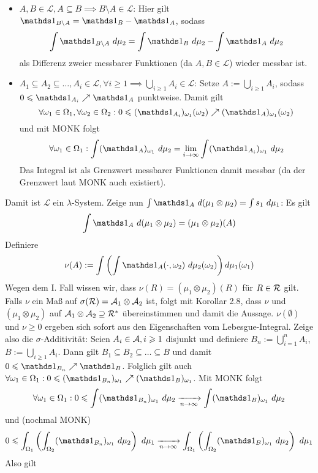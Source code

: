 \begin{enumerate}[label=\Roman*.]
\begin{itemize}
        \item $A,B\in\mathcal{L},A\subseteq B\implies B\setminus A\in\mathcal{L}$: Hier gilt $\ind{B\setminus A}=\ind{B}-\ind{A}$, sodass
        $$\int\ind{B\setminus A}\ d\mu_2=\int\ind{B}\ d\mu_2-\int\ind{A}\ d\mu_2$$
        als Differenz zweier messbarer Funktionen (da $A,B\in\mathcal{L}$) wieder messbar ist.
        \item $A_1\subseteq A_2\subseteq\hdots,A_i\in\mathcal{L},\forall i\geq1\implies\bigcup_{i\geq1}A_i\in\mathcal{L}$: Setze $A:=\bigcup_{i\geq1}A_i$, sodass $0\leq\ind{A_i}\nearrow\ind{A}$ punktweise. Damit gilt
        $$\forall\omega_1\in\Omega_1,\forall\omega_2\in\Omega_2:0\leq(\ind{A_i})_{\omega_1}(\omega_2)\nearrow(\ind{A})_{\omega_1}(\omega_2)$$
        und mit MONK folgt
        $$\forall\omega_1\in\Omega_1:\int(\ind{A})_{\omega_1}\ d\mu_2=\lim_{i\to\infty}\int(\ind{A_i})_{\omega_1}\ d\mu_2$$
        Das Integral ist als Grenzwert messbarer Funktionen damit messbar (da der Grenzwert laut MONK auch existiert).
    \end{itemize} 
    Damit ist $\mathcal{L}$ ein $\lambda$-System. Zeige nun $\int \ind{A}\ d(\mu_1\otimes\mu_2)=\int s_1\ d\mu_1$: Es gilt 
    $$\int\ind{A}\ d(\mu_1\otimes\mu_2)=(\mu_1\otimes\mu_2)(A)$$
    Definiere
    $$\nu(A):=\int\left(\int\ind{A}(\cdot,\omega_2)\ d\mu_2(\omega_2)\right)d \mu_1(\omega_1)$$
    Wegen dem I. Fall wissen wir, dass $\nu(R)=(\mu_1\otimes\mu_2)(R)$ f\"ur $R\in\mathcal{R}$ gilt. Falls $\nu$ ein Ma\ss{} auf $\sigma(\mathcal{R})=\mathcal{A}_1\otimes\mathcal{A}_2$ ist, folgt mit Korollar 2.8, dass $\nu$ und $(\mu_1\otimes\mu_2)$ auf $\mathcal{A}_1\otimes\mathcal{A}_2\supseteq\mathcal{R}^*$ \"ubereinstimmen und damit die Aussage. $\nu(\emptyset)$ und $\nu\geq0$ ergeben sich sofort aus den Eigenschaften vom Lebesgue-Integral. Zeige also die $\sigma$-Additivit\"at:\newline
    Seien $A_i\in\mathcal{A},i\geqslant1$ disjunkt und definiere $B_n:=\bigcup_{i=1}^nA_i$, $B:=\bigcup_{i\geq1}A_i$. Dann gilt
    $B_1\subseteq B_2\subseteq\hdots\subseteq B$ und damit $0\leq\ind{B_n}\nearrow \ind{B}$. Folglich gilt auch $\forall\omega_1\in\Omega_1:0\leq(\ind{B_n})_{\omega_1}\nearrow (\ind{B})_{\omega_1}$. Mit MONK folgt
    $$\forall\omega_1\in\Omega_1:0\leq\int(\ind{B_n})_{\omega_1}\ d\mu_2\nto{}{n\to\infty}\int(\ind{B})_{\omega_1}\ d\mu_2$$
    und (nochmal MONK)
    $$0\leq\int_{\Omega_1}\left(\int_{\Omega_2}(\ind{B_n})_{\omega_1}\ d\mu_2\right)\ d\mu_1\nto{}{n\to\infty}\int_{\Omega_1}\left(\int_{\Omega_2}(\ind{B})_{\omega_1}\ d\mu_2\right)\ d\mu_1$$
    Also gilt
    \begin{align*}

\end{align*}
\end{enumerate}
